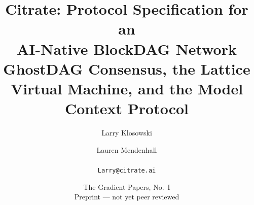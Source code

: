 

\title{\textbf{Citrate: Protocol Specification for an\\ AI-Native BlockDAG Network}\\[4pt]
\large GhostDAG Consensus, the Lattice Virtual Machine, and the Model Context Protocol}
\author{Larry Klosowski \and Lauren Mendenhall\\[2pt]\CitrateAffil\\ \texttt{Larry@citrate.ai}}
\date{The Gradient Papers, No.~I \\ Preprint --- not yet peer reviewed}


\maketitle


